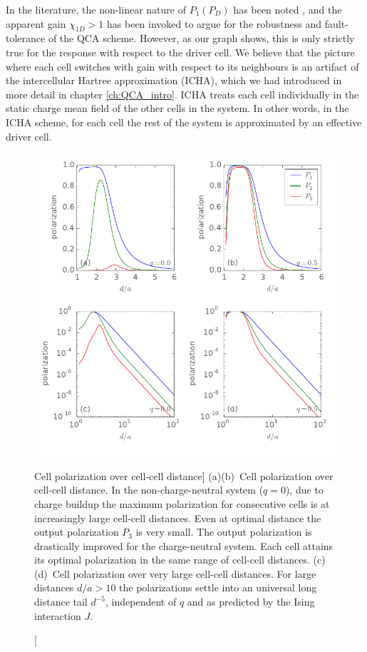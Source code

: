 In the literature, the non-linear nature of $P_1(P_D)$ has been noted
\cite{lent1993quantum} \cite{lent1993lines}, and the apparent gain $\chi_{1D} >
1$ has been invoked to argue for the robustness and fault-tolerance of the QCA
scheme. However, as our graph shows, this is only strictly true for the response
with respect to the driver cell. We believe that the picture where each cell
switches with gain with respect to its neighbours is an artifact of the
intercellular Hartree approximation (ICHA), which we had introduced in more
detail in chapter \ref{ch:QCA_intro}. ICHA treats each cell individually in the
static charge mean field of the other cells in the system. In other words, in
the ICHA scheme, for each cell the rest of the system is approximated by an
effective driver cell.

%
\begin{figure}
  \center
  \includegraphics{three_cells_P_over_d}
  \caption
  [Cell polarization over cell-cell distance]
  {
  (a)(b)~Cell polarization over cell-cell distance. In the non-charge-neutral
  system ($q = 0$), due to charge buildup the maximum polarization for
  consecutive cells is at increasingly large cell-cell distances. Even at
  optimal distance the output polarization $P_3$ is very small. The output
  polarization is drastically improved for the charge-neutral system. Each cell
  attains its optimal polarization in the same range of cell-cell distances.
  (c)(d)~Cell polarization over very large cell-cell distances. For large
  distances $d/a > 10$ the polarizations settle into an universal long distance
  tail $d^{-5}$, independent of $q$ and as predicted by the Ising interaction
  $J$.
  }
  \label{fig:three_cells_P_over_d}
\end{figure}
